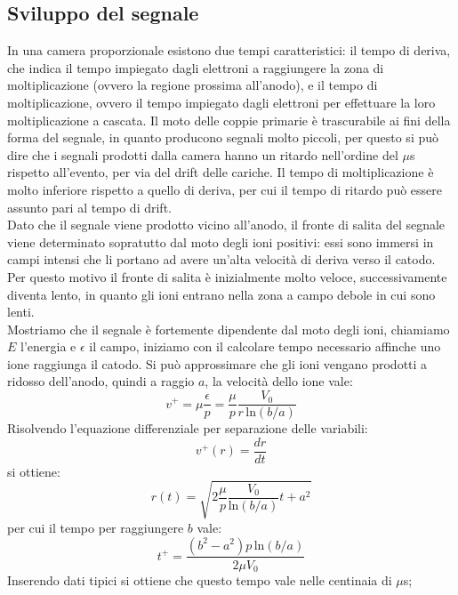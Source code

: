 \subsection{Sviluppo del segnale}
In una camera proporzionale esistono due tempi caratteristici: il tempo di deriva, che indica il tempo impiegato dagli elettroni a raggiungere la zona
di moltiplicazione (ovvero la regione prossima all'anodo), e il tempo di moltiplicazione, ovvero il tempo impiegato dagli elettroni per effettuare la loro moltiplicazione a cascata.
Il moto delle coppie primarie \`e trascurabile ai fini della forma del segnale, in quanto producono segnali molto piccoli, per questo si pu\`o
dire che i segnali prodotti dalla camera hanno un ritardo nell'ordine del $\mu$s rispetto all'evento, per via del drift delle cariche.
Il tempo di moltiplicazione \`e molto inferiore rispetto a quello di deriva, per cui il tempo di ritardo pu\`o essere assunto pari al tempo di drift.\\
Dato che il segnale viene prodotto vicino all'anodo, il fronte di salita del segnale viene determinato sopratutto dal moto degli ioni positivi:
essi sono immersi in campi intensi che li portano ad avere un'alta velocit\`a di deriva verso il catodo.
Per questo motivo il fronte di salita \`e inizialmente molto veloce, successivamente diventa lento, in quanto gli ioni entrano nella zona a campo debole in cui
sono lenti.\\
Mostriamo che il segnale \`e fortemente dipendente dal moto degli ioni, chiamiamo $E$ l'energia e $\epsilon$ il campo, iniziamo
con il calcolare tempo necessario affinche uno ione raggiunga il catodo.
Si pu\`o approssimare che gli ioni vengano prodotti a ridosso dell'anodo, quindi a raggio $a$, la velocit\`a dello ione vale:
\begin{equation*}
v^+ = \mu \frac{\epsilon}{p} = \frac{\mu}{p} \frac{V_0}{r \, \text{ln}(b/a)}
\end{equation*}
Risolvendo l'equazione differenziale per separazione delle variabili:
\begin{equation*}
v^+(r) = \frac{dr}{dt}
\end{equation*}
si ottiene:
\begin{equation*}
r(t) = \sqrt{2 \frac{\mu}{p} \frac{V_0}{\text{ln}(b/a)} t + a^2}
\end{equation*}
per cui il tempo per raggiungere $b$ vale:
\begin{equation*}
t^+ =\frac{(b^2 - a^2) p \, \text{ln}(b/a)}{2 \mu V_0}
\end{equation*}
Inserendo dati tipici si ottiene che questo tempo vale nelle centinaia di $\mu$s;

